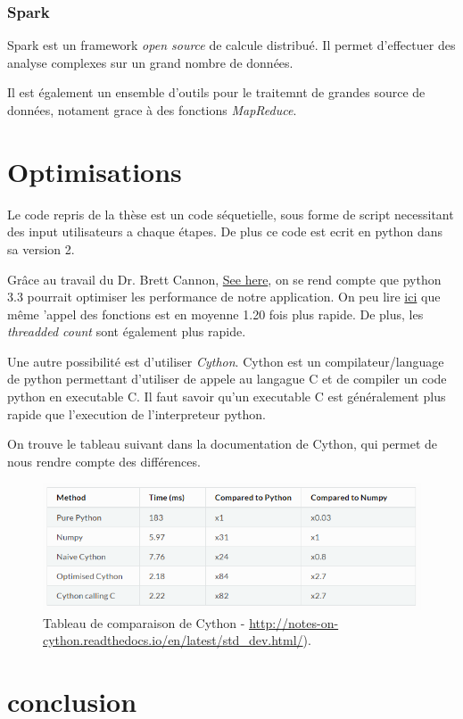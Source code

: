 \subsubsection{Spark}
Spark est un framework \emph{open source} de calcule distribué. Il permet d'effectuer des analyse complexes sur un grand nombre de données.

Il est également un ensemble d'outils pour le traitemnt de grandes source de données, notament grace à des fonctions \emph{MapReduce}.
	
\section{Optimisations}
Le code repris de la thèse \thLeite est un code séquetielle, sous forme de script necessitant des input utilisateurs a chaque étapes. De plus ce code est ecrit en python dans sa version 2.

Grâce au travail du Dr. Brett Cannon, \href{https://speakerdeck.com/pyconslides/python-3-dot-3-trust-me-its-better-than-python-2-dot-7-by-dr-brett-cannon}{See here}, on se rend compte que python 3.3 pourrait optimiser les performance de notre application. On peu lire 
\href{https://mail.python.org/pipermail/python-dev/2012-October/121923.html}{ici} que même 'appel des fonctions est en moyenne 1.20 fois plus rapide. De plus, les \emph{threadded count} sont également plus rapide.

Une autre possibilité est d'utiliser \emph{Cython}. Cython est un compilateur/language de python permettant d'utiliser de appele au langague C et de compiler un code python en executable C. Il faut savoir qu'un executable C est généralement plus rapide que l'execution de l'interpreteur python. 

On trouve le tableau suivant dans la documentation de Cython, qui permet de nous rendre compte des différences.

\begin{figure}[H] 
\centering 
\includegraphics[width=1\columnwidth]{img/table_cython} 
\caption[Tableau performences Cython]{Tableau de comparaison de Cython - \url{http://notes-on-cython.readthedocs.io/en/latest/std_dev.html/}).}
\label{fig:galleria} 
\end{figure}

\section{conclusion}
















